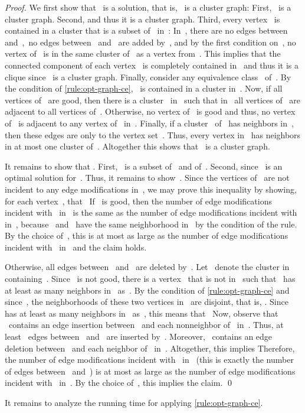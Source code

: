 \documentclass[envcountsame,numbook,smallextended]{svjour3}
\numberwithin{equation}{section}
\numberwithin{figure}{section}
\begin{document}
\begin{proof}
  We first show that~ is a solution, that is, ~is a
  cluster graph: First, ~is a cluster
  graph. Second,  and thus it is a cluster
  graph. Third, every vertex~ is contained in a cluster that is a subset of~ in~: In~, there are no edges between~ and~,~no edges between~ and~ are added by~, and by the first condition on~, no vertex of~ is in the same cluster of~ as a vertex from~. This implies that the connected component of each vertex~ is completely contained in~ and thus it is a clique since~ is a cluster graph. Finally, consider any equivalence class~ of~. By the
  condition of \cref{rule:opt-graph-ce}, ~is contained in a cluster in~.
 Now, if all vertices of~ are good, then there is a
  cluster~ in~ such that in~ all vertices of~ are
  adjacent to all vertices of~.
 Otherwise, no vertex of~
  is good and thus, no vertex of~ is adjacent to any
  vertex of~ in~. Finally, if a cluster~ of~ has neighbors in~, then these edges are only to the vertex
  set~. Thus, every vertex in~ has neighbors in at most
  one cluster of~. Altogether this shows that~ is a
  cluster graph.

  It remains to show that .
  First, ~is a subset of~ and of~. Second, 
  since~ is an optimal solution for~. Thus, it remains
  to show~. Since the vertices of~ are not incident to any edge modifications in~, we may prove this inequality by showing, for each
  vertex~, that~
  If~ is good, then the number of edge modifications incident
  with~ in~ is the same as the number of edge
  modifications incident with~ in~, because~
  and~ have the same neighborhood in~ by the condition of
  the rule. By the choice of~, this is at most as large as the
  number of edge modifications incident with~ in~ and the
  claim holds.
  
  Otherwise, all edges between~ and~ are deleted
  by~. Let~ denote the cluster in~
  containing~. Since~ is not good, there is a vertex~
  that is not in~ such that~ has at least as many neighbors
  in~ as~. By the condition of
  \cref{rule:opt-graph-ce} and since~, the
  neighborhoods of these two vertices in~ are disjoint, that
  is, . Since~
  has at least as many neighbors in~ as~, this means
  that~ Now, observe that ~contains an edge insertion between~
  and each nonneighbor of~ in~. Thus, at least~ edges between~ and~ are inserted by~. Moreover,~ contains an edge deletion between~ and each neighbor of~ in~.
  Altogether, this implies 
  Therefore, the number of edge modifications incident with~ in~ (this is exactly the number of edges  
  between~ and~) is at most as large as the number of edge modifications incident with~ in~.
  By the choice of~, this implies the claim.  \qed
\end{proof}
It remains to analyze the running time
for applying \cref{rule:opt-graph-ce}.
\end{document}
